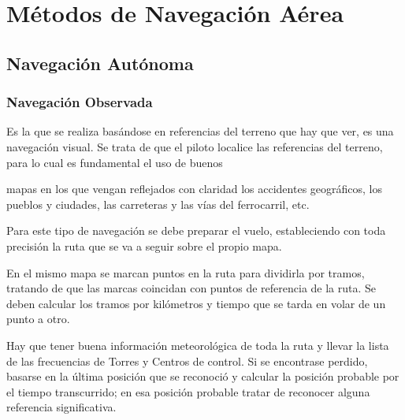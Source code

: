 \documentclass[a4paper,12pt,twoside]{article}
\begin{document}
\section{M\'etodos de Navegaci\'on A\'erea}

\subsection{Navegaci\'on Aut\'onoma}

\subsubsection{Navegaci\'on Observada \cite{Aena_SENASA_nav_aerea} }

 Es la que se realiza bas\'andose en
referencias del terreno que hay que ver, es una navegaci\'on visual.
Se trata de que el piloto localice las referencias del terreno, para lo
cual es fundamental el uso de buenos 
\begin{minipage}[b]{0.650\linewidth}
mapas en los que vengan
reflejados con claridad los accidentes geogr\'aficos, los pueblos y
ciudades, las carreteras y las v\'ias del ferrocarril, etc. \cite{Aena_SENASA_nav_aerea}

  Para este tipo de navegaci\'on se debe preparar el vuelo,
  estableciendo con toda precisi\'on la ruta que se va a seguir sobre
  el propio mapa.

  En el mismo mapa se marcan puntos en la ruta para dividirla por
  tramos, tratando de que las marcas coincidan con puntos de
  referencia de la ruta. Se deben calcular los tramos por kil\'ometros
  y tiempo que se tarda en volar de un punto a otro.

  Hay que tener buena informaci\'on meteorol\'ogica de toda la ruta y
  llevar la lista de las frecuencias de Torres y Centros de control.
  Si se encontrase perdido, basarse en la \'ultima posici\'on que se
  reconoci\'o y calcular la posici\'on probable por el tiempo
  transcurrido; en esa posici\'on probable tratar de reconocer alguna
  referencia significativa.

\end{minipage}
\end{document}
